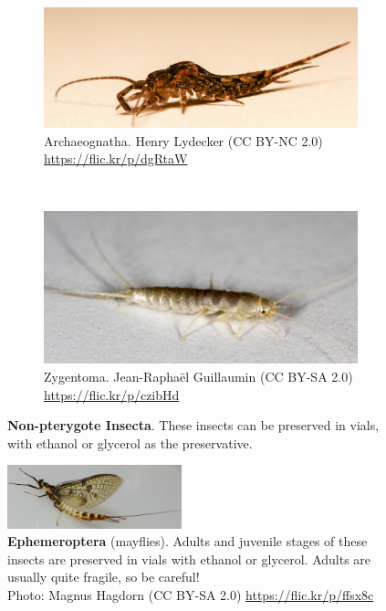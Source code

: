 \documentclass[letterpaper, 11pt]{article}
\begin{document}
\begin{figure}[h!]
    \centering
    \begin{subfigure}[t]{0.42\textwidth}
        \includegraphics[width=\textwidth]{Archeognatha}
        \caption{Archaeognatha. Henry Lydecker (CC BY-NC 2.0) \url{https://flic.kr/p/dgRtaW}}
        \label{fig:archeognatha}
    \end{subfigure}
    ~ 
    \begin{subfigure}[t]{0.4\textwidth}
        \includegraphics[width=\textwidth]{Zygentoma}
        \caption{Zygentoma. Jean-Rapha\"{e}l Guillaumin (CC BY-SA 2.0) \url{https://flic.kr/p/czibHd}}
        \label{fig:zygentoma}
    \end{subfigure}
    \caption{\textbf{Non-pterygote Insecta}. These insects can be preserved in vials, with ethanol or glycerol as the preservative.}
    \label{fig:winglesshexapods}
\end{figure}

\begin{figure}
  \caption{\textbf{Ephemeroptera} (mayflies). Adults and juvenile stages of these insects  are preserved in vials with ethanol or glycerol. Adults are usually quite fragile, so be careful!\\ Photo: Magnus Hagdorn (CC BY-SA 2.0) \url{https://flic.kr/p/ffsx8c}}
  \includegraphics[width=0.45\textwidth]{Ephemeroptera}
\end{figure}
\end{document}
